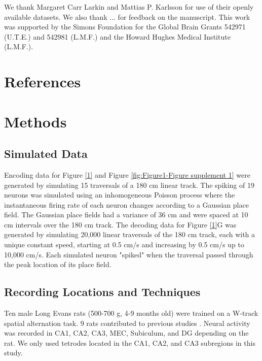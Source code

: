 \documentclass[times, twoside]{zHenriquesLab-StyleBioRxiv}
\begin{document}
\begin{acknowledgements}
We thank Margaret Carr Larkin and Mattias P. Karlsson for use of their openly available datasets. We also thank ... for feedback on the manuscript. This work was supported by the Simons Foundation for the Global Brain Grants 542971 (U.T.E.) and 542981 (L.M.F.) and the Howard Hughes Medical Institute (L.M.F.).
\end{acknowledgements}

\section*{References}


\onecolumn
\newpage

\section*{Methods}

\subsection*{Simulated Data}
Encoding data for Figure \ref{1} and Figure \ref{fig:Figure1-Figure supplement 1} were generated by simulating 15 traversals of a 180 cm linear track. The spiking of 19 neurons was simulated using an inhomogeneous Poisson process where the instantaneous firing rate of each neuron changes according to a Gaussian place field. The Gaussian place fields had a variance of 36 cm and were spaced at 10 cm intervals over the 180 cm track. The decoding data for Figure \ref{1}G was generated by simulating 20,000 linear traversals of the 180 cm track, each with a unique constant speed, starting at 0.5 cm/s and increasing by 0.5 cm/s up to 10,000 cm/s. Each simulated neuron "spiked" when the traversal passed through the peak location of its place field.

\subsection*{Recording Locations and Techniques}
Ten male Long Evans rats (500-700 g, 4-9 months old) were trained on a W-track spatial alternation task. 9 rats contributed to previous studies \cite{KarlssonAwakereplayremote2009, KayConstantSubsecondCycling2020, Kayhippocampalnetworkspatial2016, CarrTransientSlowGamma2012}. Neural activity was recorded in CA1, CA2, CA3, MEC, Subiculum, and DG depending on the rat. We only used tetrodes located in the CA1, CA2, and CA3 subregions in this study.
\end{document}
